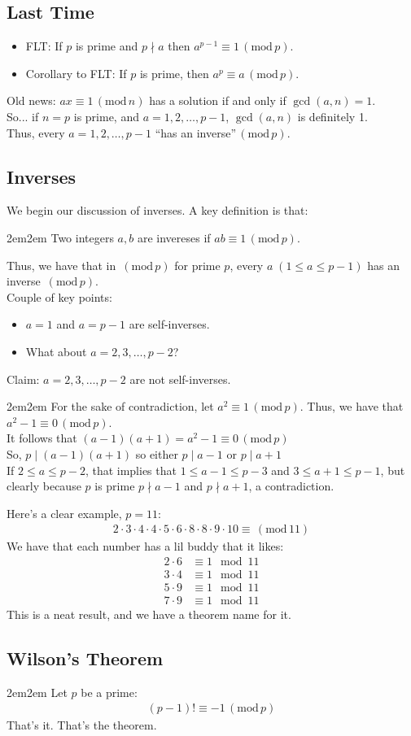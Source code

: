 \documentclass[10pt,oneside]{book}
\newcommand{\gspc}{\vspace{0.13cm}} %
\newcommand{\gline}{\gspc\\} %
\newcommand{\gmod}[1]{\,(\text{mod}\,#1)}
\let\endoldproof\endproof
\renewenvironment{proof}[1][\proofname]
  {\vspace{0.2cm}\begin{adjustwidth}{2em}{2em}
   \oldproof[#1]}
  {\endoldproof
\end{adjustwidth}}
\begin{document}
\newcommand{\cg}[1]{\color{OliveGreen}#1\color{white}}
\newcommand{\cb}[1]{\color{BlueViolet}#1\color{white}}

\subsection*{Last Time}
\begin{itemize}
	\item FLT: If $p$ is prime and $p\nmid a$ then $a^{p-1}\equiv 1\gmod p$. 
	\item Corollary to FLT: If $p$ is prime, then $a^p\equiv a\gmod p$. 
\end{itemize}
Old news: $ax\equiv 1\gmod n$ has a solution if and only if $\gcd(a,n)= 1$. \\
So... if $n=p$ is prime, and $a = 1,2,\ldots, p-1$, $\gcd(a,n)$ is definitely 1. \\
Thus, every $a = 1,2,\ldots, p-1$ ``has an inverse''$\gmod p$.
\subsection*{Inverses}
We begin our discussion of inverses. A key definition is that:\gspc
\begin{adjustwidth}{2em}{2em}
	Two integers $a,b$ are invereses if $ab\equiv 1\gmod p$.
\end{adjustwidth}\gspc
Thus, we have that in $\gmod p$ for prime $p$, every $a \;(1\le a \le p - 1)$ has an inverse $\gmod p$.\gline
Couple of key points:
\begin{itemize}[itemsep=0pt, parsep=0pt]
	\item $a = 1$ and $a = p-1$ are self-inverses. 
	\item What about $a = 2,3,\ldots, p-2$?
\end{itemize}
Claim: $a = 2, 3, \ldots, p-2$ are not self-inverses.
\begin{proof}
	For the sake of contradiction, let $a^2\equiv 1\gmod p$. Thus, we have that $a^2 -1 \equiv 0 \gmod p$. \gline
	It follows that $(a-1)(a+1)=a^2 - 1\equiv 0 \gmod p$\gline
	So, $p\mid (a-1)(a+1)$ so either $p\mid a - 1$ or $p\mid a+1$\gline
	If $2\le a\le p -2$, that implies that $1 \le a- 1 \le p-3$ and $3 \le a+1\le p-1$, but clearly because $p$ is prime $p\nmid a -1$ and $p\nmid a+1$, a contradiction.
\end{proof}
Here's a clear example, $p = 11$:
\begin{align*}
	2\cdot 3\cdot 4\cdot 4 \cdot 5 \cdot 6\cdot 8 \cdot 8 \cdot 9 \cdot 10 \equiv \gmod {11}
\end{align*}
We have that each number has a lil buddy that it likes:
\begin{align*}
	2\cdot 6 &\equiv 1 \mod 11\\
	3\cdot 4 &\equiv 1 \mod 11\\
	5\cdot 9 &\equiv 1 \mod 11\\
	7\cdot 9 &\equiv 1 \mod 11
\end{align*}
This is a neat result, and we have a theorem name for it. 
\subsection*{Wilson's Theorem}
\begin{adjustwidth}{2em}{2em}
	Let $p$ be a prime:
	\begin{gather*}
		(p-1)! \equiv -1 \gmod p
	\end{gather*}
	That's it. That's the theorem. 
\end{adjustwidth}
\end{document}

